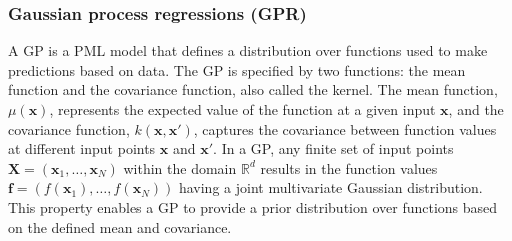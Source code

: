 \documentclass[11pt]{article}
\begin{document}
\subsubsection{Gaussian process regressions (GPR)} \label{Subsubsection: GPR}
A \ac{GP} is a \ac{PML} model that defines a distribution over functions used to make predictions based on data. 
The \ac{GP} is specified by two functions: the mean function and the covariance function, also called the kernel. 
The mean function, \( \mu (\mathbf{x}) \), represents the expected value of the function at a given input \( \mathbf{x} \), 
and the covariance function, \( k(\mathbf{x}, \mathbf{x}') \), 
captures the covariance between function values at different input points \( \mathbf{x} \) and \( \mathbf{x}' \).
In a \ac{GP}, any finite set of input points \( \mathbf{X} = (\mathbf{x}_1, \dots, \mathbf{x}_N) \) within the domain \( \mathbb{R}^d \) 
results in the function values \( \mathbf{f} = (f(\mathbf{x}_1), \dots, f(\mathbf{x}_N)) \) having a joint multivariate Gaussian distribution.
This property enables a GP to provide a prior distribution over functions based on the defined mean and covariance.
\end{document}
